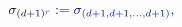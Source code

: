\documentclass[12pt]{article}
\begin{document}
\makeatletter
\renewcommand*{\@textcolor}[3]{%
  \protect\leavevmode
  \begingroup
    \color#1{#2}#3%
  \endgroup
}
\makeatother
\begin{displaymath}
\mathcolor[RGB]{0,0,15}{\sigma} _ { \mathcolor[RGB]{0,0,30}{(} \mathcolor[RGB]{0,0,45}{d} \mathcolor[RGB]{0,0,60}{+} \mathcolor[RGB]{0,0,75}{1} \mathcolor[RGB]{0,0,90}{)} ^ { \mathcolor[RGB]{0,0,105}{r} } } \mathcolor[RGB]{0,0,120}{:} \mathcolor[RGB]{0,0,135}{=} \mathcolor[RGB]{0,0,150}{\sigma} _ { \mathcolor[RGB]{0,0,165}{(} \mathcolor[RGB]{0,0,180}{d} \mathcolor[RGB]{0,0,195}{+} \mathcolor[RGB]{0,0,210}{1} \mathcolor[RGB]{0,0,225}{,} \mathcolor[RGB]{0,0,240}{d} \mathcolor[RGB]{0,0,255}{+} \mathcolor[RGB]{0,15,0}{1} \mathcolor[RGB]{0,15,15}{,} \mathcolor[RGB]{0,15,30}{.} \mathcolor[RGB]{0,15,45}{.} \mathcolor[RGB]{0,15,60}{.} \mathcolor[RGB]{0,15,75}{,} \mathcolor[RGB]{0,15,90}{d} \mathcolor[RGB]{0,15,105}{+} \mathcolor[RGB]{0,15,120}{1} \mathcolor[RGB]{0,15,135}{)} } \mathcolor[RGB]{0,15,150}{,}
\end{displaymath}
\end{document}
